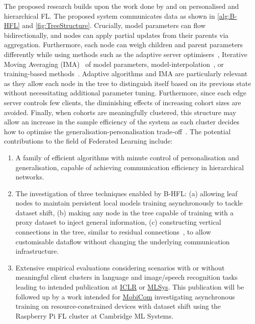 The proposed research builds upon the work done by \citet{EuroMLSysWorkshop} and \citet{OperaWorkshop} on personalised and hierarchical FL. The proposed system communicates data as shown in \cref{alg:B-HFL} and \cref{fig:TreeStructure}. Crucially, model parameters can flow bidirectionally, and nodes can apply partial updates from their parents via aggregation. Furthermore, each node can weigh children and parent parameters differently while using methods such as the adaptive server optimisers~\citep{FedOPT}, Iterative Moving Averaging (IMA)~\citep{UnderstandingModelAveragingInFL} of model parameters, model-interpolation~\citep{AdaptivePersonalisedFederatedLearning,FederatedLearningMixtureOfGlobalAndLocal}, or training-based methods~\citep{Ditto,EWC,DeepMutualLearning,PersonalisedFLFirstOrder}. Adaptive algorithms and IMA are particularly relevant as they allow each node in the tree to distinguish itself based on its previous state without necessitating additional parameter tuning. Furthermore, since each edge server controls few clients, the diminishing effects of increasing cohort sizes are avoided.  Finally, when cohorts are meaningfully clustered, this structure may allow an increase in the sample efficiency of the system as each cluster decides how to optimise the generalisation-personalisation trade-off~\citep{PersonalisationGeneralisationTradeoff,Auxo}. The potential contributions to the field of Federated Learning include:
\begin{enumerate}
    \item A family of efficient algorithms with minute control of personalisation and generalisation, capable of achieving communication efficiency in hierarchical networks.
    \item The investigation of three techniques enabled by B-HFL\@: (a) allowing leaf nodes to maintain persistent local models training asynchronously to tackle dataset shift, (b) making any node in the tree capable of training with a proxy dataset to inject general information, (c) constructing vertical connections in the tree, similar to residual connections~\citep{ResNet}, to allow customisable dataflow without changing the underlying communication infrastructure.
    \item Extensive empirical evaluations considering scenarios with or without meaningful client clusters in language and image/speech recognition tasks leading to intended publication at \href{https://iclr.cc/}{ICLR} or \href{https://mlsys.org/}{MLSys}. This publication will be followed up by a work intended for \href{https://sigmobile.org/mobicom/2023/}{MobiCom} investigating asynchronous training on resource-constrained devices with dataset shift using the Raspberry Pi FL cluster at Cambridge ML Systems.
\end{enumerate}









